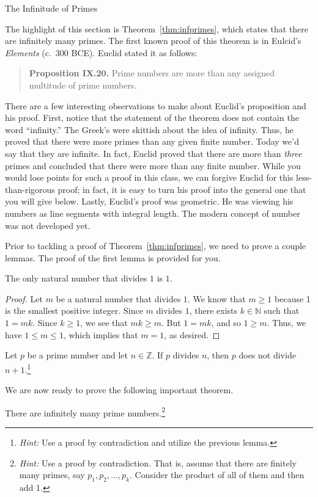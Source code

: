 \begin{section}{The Infinitude of Primes}

The highlight of this section is Theorem~\ref{thm:infprimes}, which states that there are infinitely many primes. The first known proof of this theorem is in Eulcid's \emph{Elements} (c.\ 300 BCE). Euclid stated it as follows: 
\begin{quote}
\textbf{Proposition IX.20.} Prime numbers are more than any assigned multitude of prime numbers.
\end{quote}
There are a few interesting observations to make about Euclid's proposition and his proof. First, notice that the statement of the theorem does not contain the word ``infinity.'' The Greek's were skittish about the idea of infinity. Thus, he proved that there were more primes than any given finite number. Today we'd say that they are infinite. In fact, Euclid proved that there are more than \emph{three} primes and concluded that there were more than any finite number. While you would lose points for such a proof in this class, we can forgive Euclid for this less-than-rigorous proof;  in fact, it is easy to turn his proof into the general one that you will give below. Lastly, Euclid's proof was geometric. He was viewing his numbers as line segments with integral length. The modern concept of number was not developed yet.

Prior to tackling a proof of Theorem~\ref{thm:infprimes}, we need to prove a couple lemmas.  The proof of the first lemma is provided for you. 

\begin{lemma}\label{lem:divisorsof1}
The only natural number that divides $1$ is $1$.  
\end{lemma}

\begin{proof}
Let $m$ be a natural number that divides $1$. We know that $m\geq 1$ because 1 is the smallest positive integer. Since $m$ divides $1$, there exists $k\in \mathbb{N}$ such that $1=mk$. Since $k\geq 1$, we see that $mk\geq m$.  But $1=mk$, and so $1\geq m$.  Thus, we have $1\leq m \leq 1$, which implies that $m=1$, as desired.
\end{proof}

\begin{lemma}\label{lem:plus1}
Let $p$ be a prime number  and let $n\in \mathbb{Z}$. If $p$ divides $n$, then $p$ does not divide $n+1$.\footnote{\emph{Hint:} Use a proof by contradiction and utilize the previous lemma.}
\end{lemma}

We are now ready to prove the following important theorem.

\begin{theorem}\label{thm:infprimes}
There are infinitely many prime numbers.\footnote{\emph{Hint:} Use a proof by contradiction. That is, assume that there are finitely many primes, say $p_1, p_2,\ldots,p_k$.  Consider the product of all of them and then add 1.}
\end{theorem}

\end{section}